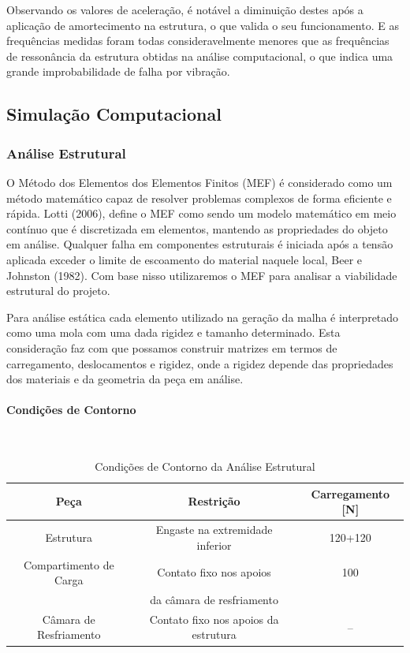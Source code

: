 Observando os valores de aceleração, é notável a diminuição destes após a aplicação de amortecimento na estrutura, o que valida o seu funcionamento. E as frequências medidas foram todas consideravelmente menores que as frequências de ressonância da estrutura obtidas na análise computacional, o que indica uma grande improbabilidade de falha por vibração.

\subsection{Simulação Computacional}

\subsubsection{Análise Estrutural}

O Método dos Elementos dos Elementos Finitos (MEF) é considerado como um método matemático capaz de resolver problemas complexos de forma eficiente e rápida. Lotti (2006), define o MEF como sendo um modelo matemático em meio contínuo que é discretizada em elementos, mantendo as propriedades do objeto em análise. Qualquer falha em componentes estruturais é iniciada após a tensão aplicada exceder o limite de escoamento do material naquele local, Beer e Johnston (1982). Com base nisso utilizaremos o MEF para analisar a viabilidade estrutural do projeto.

Para análise estática cada elemento utilizado na geração da malha é interpretado como uma mola com uma dada rigidez e tamanho determinado. Esta consideração faz com que possamos construir matrizes em termos de carregamento, deslocamentos e rigidez, onde a rigidez depende das propriedades dos materiais e da geometria da peça em análise.

\paragraph*{Condições de Contorno}\

\begin{table}[H]
	\centering
	\caption{Condições de Contorno da Análise Estrutural}
	\label{condcontornoestrut}
	\begin{tabular}{|c|c|c|}
		\hline
		Peça                   & Restrição                            & Carregamento {[}N{]}\\ \hline
		Estrutura              & Engaste na extremidade inferior      & 120+120  \\ \hline
		Compartimento de Carga & Contato fixo nos apoios              & 100 \\ 
		& da câmara de resfriamento            &     \\ \hline
		Câmara de Resfriamento & Contato fixo nos apoios da estrutura & --  \\ \hline
	\end{tabular}
\end{table}

